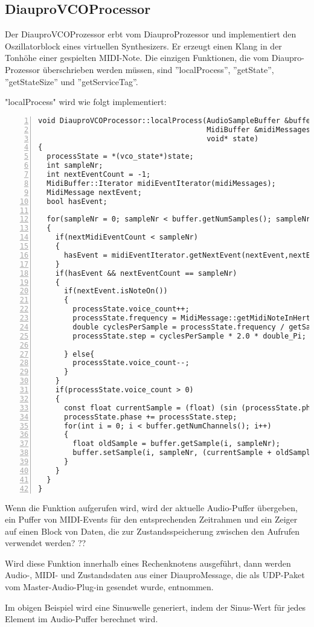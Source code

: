 \subsection{DiauproVCOProcessor}

Der DiauproVCOProzessor erbt vom DiauproProzessor und implementiert den Oszillatorblock eines virtuellen Synthesizers. Er erzeugt einen Klang in der Tonhöhe einer gespielten MIDI-Note. Die einzigen Funktionen, die vom Diaupro-Prozessor überschrieben werden müssen, sind ”localProcess”, ”getState”, ”getStateSize” und ”getServiceTag”.

"localProcess" wird wie folgt implementiert:
\begin{lstlisting}[numbers=left]
void DiauproVCOProcessor::localProcess(AudioSampleBuffer &buffer,
                                       MidiBuffer &midiMessages,
                                       void* state)
{
  processState = *(vco_state*)state;
  int sampleNr;
  int nextEventCount = -1;
  MidiBuffer::Iterator midiEventIterator(midiMessages);
  MidiMessage nextEvent;
  bool hasEvent;

  for(sampleNr = 0; sampleNr < buffer.getNumSamples(); sampleNr++)
  {
    if(nextMidiEventCount < sampleNr)
    {
      hasEvent = midiEventIterator.getNextEvent(nextEvent,nextEventCount )
    }
    if(hasEvent && nextEventCount == sampleNr)
    {
      if(nextEvent.isNoteOn())
      {
        processState.voice_count++;
        processState.frequency = MidiMessage::getMidiNoteInHertz(nextEvent.getNoteNumber());
        double cyclesPerSample = processState.frequency / getSampleRate();
        processState.step = cyclesPerSample * 2.0 * double_Pi;

      } else{
        processState.voice_count--;
      }
    }
    if(processState.voice_count > 0)
    {
      const float currentSample = (float) (sin (processState.phase) * processState.level);
      processState.phase += processState.step;
      for(int i = 0; i < buffer.getNumChannels(); i++)
      {
        float oldSample = buffer.getSample(i, sampleNr);
        buffer.setSample(i, sampleNr, (currentSample + oldSample)*0.5);
      }
    }
  }
}
\end{lstlisting}

\noindent
Wenn die Funktion aufgerufen wird, wird der aktuelle Audio-Puffer übergeben, ein Puffer von MIDI-Events für den entsprechenden Zeitrahmen und ein Zeiger auf einen Block von Daten, die zur Zustandsspeicherung zwischen den Aufrufen verwendet werden? ??

Wird diese Funktion innerhalb eines Rechenknotens ausgeführt, dann werden Audio-, MIDI- und Zustandsdaten aus einer DiauproMessage, die als UDP-Paket vom Master-Audio-Plug-in gesendet wurde, entnommen.

Im obigen Beispiel wird eine Sinuswelle generiert, indem der Sinus-Wert für jedes Element im Audio-Puffer berechnet wird.